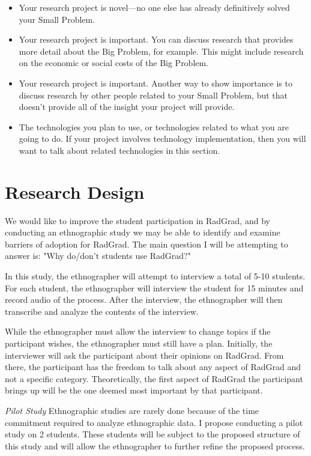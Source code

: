 \documentclass[english]{proposalnsf}
\begin{document}
\begin{itemize}
\item Your research project is novel---no one else has already definitively solved your Small Problem.
\item Your research project is important. You can discuss research that provides more detail about the Big Problem, for example. This might include research on the economic or social costs of the Big Problem.
\item Your research project is important.  Another way to show importance is to discuss research by other people related to your Small Problem, but that doesn't provide all of the insight your project will provide.
\item The technologies you plan to use, or technologies related to what you are going to do. If your project involves technology implementation, then you will want to talk about related technologies in this section.
\end{itemize}

\section{Research Design}
\label{research-design}

We would like to improve the student participation in RadGrad, and by conducting an ethnographic study we may be able to identify and examine barriers of adoption for RadGrad. The main question I will be attempting to answer is: "Why do/don't students use RadGrad?"

In this study, the ethnographer will attempt to interview a total of 5-10 students. For each student, the ethnographer will interview the student for 15 minutes and record audio of the process. After the interview, the ethnographer will then transcribe and analyze the contents of the interview. 

While the ethnographer must allow the interview to change topics if the participant wishes, the ethnographer must still have a plan. Initially, the interviewer will ask the participant about their opinions on RadGrad. From there, the participant has the freedom to talk about any aspect of RadGrad and not a specific category. Theoretically, the first aspect of RadGrad the participant brings up will be the one deemed most important by that participant. 

{\em Pilot Study}
Ethnographic studies are rarely done because of the time commitment required to analyze ethnographic data. I propose conducting a pilot study on 2 students. These students will be subject to the proposed structure of this study and will allow the ethnographer to further refine the proposed process. 
\end{document}
